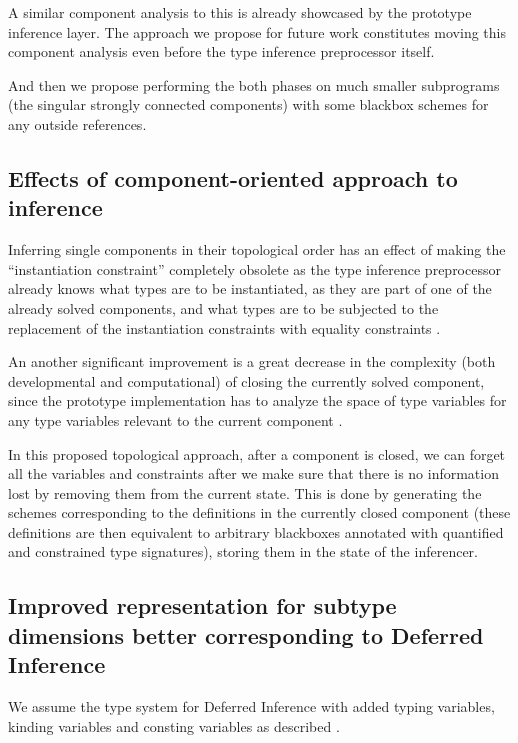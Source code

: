 A similar component analysis to this is already showcased by the prototype inference layer. The approach we propose for future work constitutes moving this component analysis even before the type inference preprocessor itself.

And then we propose performing the both phases on much smaller subprograms (the singular strongly connected components) with some blackbox schemes for any outside references. 

\subsection{Effects of component-oriented approach to inference}

Inferring single components in their topological order has an effect of making the ``instantiation constraint''  completely obsolete as the type inference preprocessor already knows what types are to be instantiated, as they are part of one of the already solved components, and what types are to be subjected to the replacement of the instantiation constraints with equality constraints .

An another significant improvement is a great decrease in the complexity (both developmental and computational) of closing the currently solved component, since the prototype implementation has to analyze the space of type variables for any type variables relevant to the current component .

In this proposed topological approach, after a component is closed, we can forget all the variables and constraints after we make sure that there is no information lost by removing them from the current state. This is done by generating the schemes  corresponding to the definitions in the currently closed component (these definitions are then equivalent to arbitrary blackboxes annotated with quantified and constrained type signatures), storing them in the state of the inferencer.

\subsection{Improved representation for subtype dimensions better corresponding to Deferred Inference}

We assume the type system for Deferred Inference with added typing variables, kinding variables and consting variables as described .

